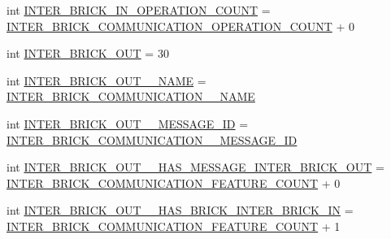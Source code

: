 \begin{DoxyCompactItemize}
\item 
int \hyperlink{interfaceshootingmachineemfmodel_1_1_shootingmachineemfmodel_package_ae45162b06be73d468fa3ca17e605386b}{I\-N\-T\-E\-R\-\_\-\-B\-R\-I\-C\-K\-\_\-\-I\-N\-\_\-\-O\-P\-E\-R\-A\-T\-I\-O\-N\-\_\-\-C\-O\-U\-N\-T} = \hyperlink{interfaceshootingmachineemfmodel_1_1_shootingmachineemfmodel_package_afd388b80427475bafc3ae00abc93859e}{I\-N\-T\-E\-R\-\_\-\-B\-R\-I\-C\-K\-\_\-\-C\-O\-M\-M\-U\-N\-I\-C\-A\-T\-I\-O\-N\-\_\-\-O\-P\-E\-R\-A\-T\-I\-O\-N\-\_\-\-C\-O\-U\-N\-T} + 0
\item 
int \hyperlink{interfaceshootingmachineemfmodel_1_1_shootingmachineemfmodel_package_a5a45c2cf9d3a86925ddc1576e9a6a067}{I\-N\-T\-E\-R\-\_\-\-B\-R\-I\-C\-K\-\_\-\-O\-U\-T} = 30
\item 
int \hyperlink{interfaceshootingmachineemfmodel_1_1_shootingmachineemfmodel_package_aeb8a19245df5e748397250402f289112}{I\-N\-T\-E\-R\-\_\-\-B\-R\-I\-C\-K\-\_\-\-O\-U\-T\-\_\-\-\_\-\-N\-A\-M\-E} = \hyperlink{interfaceshootingmachineemfmodel_1_1_shootingmachineemfmodel_package_abb5392d911aa5f7d4a788a7d7526f30b}{I\-N\-T\-E\-R\-\_\-\-B\-R\-I\-C\-K\-\_\-\-C\-O\-M\-M\-U\-N\-I\-C\-A\-T\-I\-O\-N\-\_\-\-\_\-\-N\-A\-M\-E}
\item 
int \hyperlink{interfaceshootingmachineemfmodel_1_1_shootingmachineemfmodel_package_ac3c4d61454b9187d78da2ff997644996}{I\-N\-T\-E\-R\-\_\-\-B\-R\-I\-C\-K\-\_\-\-O\-U\-T\-\_\-\-\_\-\-M\-E\-S\-S\-A\-G\-E\-\_\-\-I\-D} = \hyperlink{interfaceshootingmachineemfmodel_1_1_shootingmachineemfmodel_package_a291f0af122b36942c2271b0c1b5fc389}{I\-N\-T\-E\-R\-\_\-\-B\-R\-I\-C\-K\-\_\-\-C\-O\-M\-M\-U\-N\-I\-C\-A\-T\-I\-O\-N\-\_\-\-\_\-\-M\-E\-S\-S\-A\-G\-E\-\_\-\-I\-D}
\item 
int \hyperlink{interfaceshootingmachineemfmodel_1_1_shootingmachineemfmodel_package_ac409257626c9e2b3616fc157504f929b}{I\-N\-T\-E\-R\-\_\-\-B\-R\-I\-C\-K\-\_\-\-O\-U\-T\-\_\-\-\_\-\-H\-A\-S\-\_\-\-M\-E\-S\-S\-A\-G\-E\-\_\-\-I\-N\-T\-E\-R\-\_\-\-B\-R\-I\-C\-K\-\_\-\-O\-U\-T} = \hyperlink{interfaceshootingmachineemfmodel_1_1_shootingmachineemfmodel_package_a8d13017baf2c20e1387a03aa9657d5ff}{I\-N\-T\-E\-R\-\_\-\-B\-R\-I\-C\-K\-\_\-\-C\-O\-M\-M\-U\-N\-I\-C\-A\-T\-I\-O\-N\-\_\-\-F\-E\-A\-T\-U\-R\-E\-\_\-\-C\-O\-U\-N\-T} + 0
\item 
int \hyperlink{interfaceshootingmachineemfmodel_1_1_shootingmachineemfmodel_package_a1b082b162aee9b1ea89c4c9366027203}{I\-N\-T\-E\-R\-\_\-\-B\-R\-I\-C\-K\-\_\-\-O\-U\-T\-\_\-\-\_\-\-H\-A\-S\-\_\-\-B\-R\-I\-C\-K\-\_\-\-I\-N\-T\-E\-R\-\_\-\-B\-R\-I\-C\-K\-\_\-\-I\-N} = \hyperlink{interfaceshootingmachineemfmodel_1_1_shootingmachineemfmodel_package_a8d13017baf2c20e1387a03aa9657d5ff}{I\-N\-T\-E\-R\-\_\-\-B\-R\-I\-C\-K\-\_\-\-C\-O\-M\-M\-U\-N\-I\-C\-A\-T\-I\-O\-N\-\_\-\-F\-E\-A\-T\-U\-R\-E\-\_\-\-C\-O\-U\-N\-T} + 1

\end{DoxyCompactItemize}
